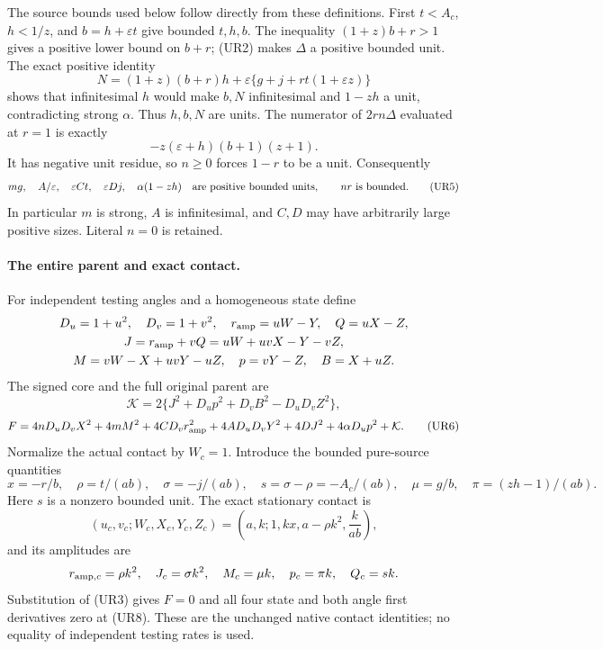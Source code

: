 The source bounds used below follow directly from these definitions.
First $t<A_c$, $h<1/z$, and $b=h+\varepsilon t$ give bounded $t,h,b$.
The inequality $(1+z)b+r>1$ gives a positive lower bound on $b+r$;
(UR2) makes $\Delta$ a positive bounded unit. The exact positive identity
\[
 N=(1+z)(b+r)h+
       \varepsilon\{g+j+rt(1+\varepsilon z)\}                 \tag{UR4}
\]
shows that infinitesimal $h$ would make $b,N$ infinitesimal and
$1-zh$ a unit, contradicting strong $\alpha$. Thus $h,b,N$ are units.
The numerator of $2rn\Delta$ evaluated at $r=1$ is exactly
\[
 -z(\varepsilon+h)(b+1)(z+1).
\]
It has negative unit residue, so $n\ge0$ forces $1-r$ to be a unit.
Consequently
\[
 mg,\quad A/\varepsilon,\quad \varepsilon Ct,\quad
 \varepsilon Dj,\quad \alpha(1-zh)
 \quad\hbox{are positive bounded units},\qquad nr\text{ is bounded}.
 \tag{UR5}\label{eq:ui-source-bounds}
\]
In particular $m$ is strong, $A$ is infinitesimal, and $C,D$ may have
arbitrarily large positive sizes. Literal $n=0$ is retained.

\paragraph{The entire parent and exact contact.}
For independent testing angles and a homogeneous state define
\[
 \begin{gathered}
 D_u=1+u^2,\quad D_v=1+v^2,\quad
 r_{\rm amp}=uW-Y,\quad Q=uX-Z,\\
 J=r_{\rm amp}+vQ=uW+uvX-Y-vZ,\\
 M=vW-X+uvY-uZ,\quad p=vY-Z,\quad B=X+uZ.
 \end{gathered}
\]
The signed core and the full original parent are
\[
 \mathcal K=2\{J^2+D_up^2+D_vB^2-D_uD_vZ^2\},
\]
\[
 F=4nD_uD_vX^2+4mM^2+4CD_vr_{\rm amp}^2
       +4AD_uD_vY^2+4DJ^2+4\alpha D_up^2+\mathcal K.
 \tag{UR6}\label{eq:ui-full-parent}
\]
Normalize the actual contact by $W_c=1$. Introduce the bounded pure-source
quantities
\[
 x=-r/b,\quad \rho=t/(ab),\quad \sigma=-j/(ab),\quad
 s=\sigma-\rho=-A_c/(ab),\quad
 \mu=g/b,\quad \pi=(zh-1)/(ab).                       \tag{UR7}
 \label{eq:ui-contact-amplitudes}
\]
Here $s$ is a nonzero bounded unit. The exact stationary contact is
\[
 (u_c,v_c;W_c,X_c,Y_c,Z_c)
 =\left(a,k;1,kx,a-\rho k^2,\frac{k}{ab}\right),       \tag{UR8}
\]
and its amplitudes are
\[
 r_{{\rm amp},c}=\rho k^2,\quad J_c=\sigma k^2,\quad
 M_c=\mu k,\quad p_c=\pi k,\quad Q_c=sk.
\]
Substitution of (UR3) gives $F=0$ and all four state and both angle
first derivatives zero at (UR8). These are the unchanged native
contact identities; no equality of independent testing rates is used.

